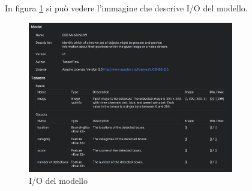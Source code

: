 In figura \ref{fig:modello} si può vedere l’immagine che descrive I/O del modello.

\begin{figure}[ht]
    \centering
    \includegraphics[width=0.8\textwidth]{Immagini/App/modello.png}
    \caption{I/O del modello}
    \label{fig:modello}
\end{figure}
